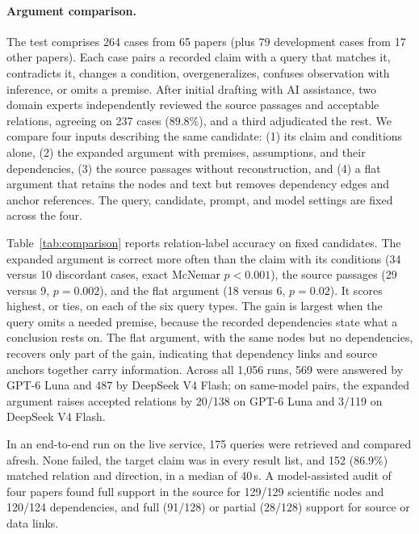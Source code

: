 \documentclass[sigconf,screen,review]{acmart}
\begin{document}
\paragraph{Argument comparison.}
The test comprises 264 cases from 65 papers (plus 79 development cases from 17 other papers). Each case pairs a recorded claim with a query that matches it, contradicts it, changes a condition, overgeneralizes, confuses observation with inference, or omits a premise. After initial drafting with AI assistance, two domain experts independently reviewed the source passages and acceptable relations, agreeing on 237 cases (89.8\%), and a third adjudicated the rest. We compare four inputs describing the same candidate: (1) its claim and conditions alone, (2) the expanded argument with premises, assumptions, and their dependencies, (3) the source passages without reconstruction, and (4) a flat argument that retains the nodes and text but removes dependency edges and anchor references. The query, candidate, prompt, and model settings are fixed across the four.

Table~\ref{tab:comparison} reports relation-label accuracy on fixed candidates. The expanded argument is correct more often than the claim with its conditions (34 versus 10 discordant cases, exact McNemar $p<0.001$), the source passages (29 versus 9, $p=0.002$), and the flat argument (18 versus 6, $p=0.02$). It scores highest, or ties, on each of the six query types. The gain is largest when the query omits a needed premise, because the recorded dependencies state what a conclusion rests on. The flat argument, with the same nodes but no dependencies, recovers only part of the gain, indicating that dependency links and source anchors together carry information. Across all 1,056 runs, 569 were answered by GPT-6 Luna and 487 by DeepSeek V4 Flash; on same-model pairs, the expanded argument raises accepted relations by 20/138 on GPT-6 Luna and 3/119 on DeepSeek V4 Flash.

In an end-to-end run on the live service, 175 queries were retrieved and compared afresh. None failed, the target claim was in every result list, and 152 (86.9\%) matched relation and direction, in a median of 40\,s. A model-assisted audit of four papers found full support in the source for 129/129 scientific nodes and 120/124 dependencies, and full (91/128) or partial (28/128) support for source or data links.
\end{document}
